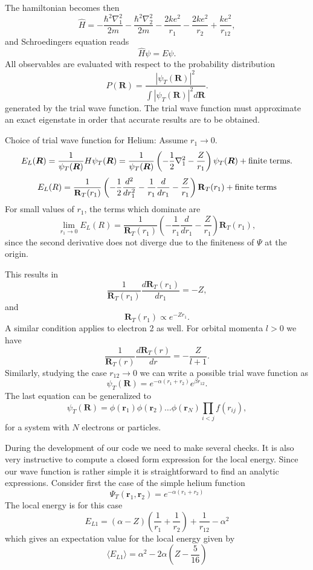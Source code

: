 \documentclass[%
oneside,                 %
final,                   %
10pt]{article}
\begin{document}
The hamiltonian becomes then
\[
   \hat{H}=-\frac{\hbar^2\nabla_1^2}{2m}-\frac{\hbar^2\nabla_2^2}{2m}
          -\frac{2ke^2}{r_1}-\frac{2ke^2}{r_2}+
               \frac{ke^2}{r_{12}},
\]
and  Schroedingers equation reads
\[
   \hat{H}\psi=E\psi.
\]
All observables are evaluated with respect to the probability distribution
\[
   P(\bm{R})= \frac{\left|\psi_T(\bm{R})\right|^2}{\int \left|\psi_T(\bm{R})\right|^2d\bm{R}}.
\]
generated by the trial wave function.   
The trial wave function must approximate an exact 
eigenstate in order that accurate results are to be obtained. 

Choice of trial wave function for Helium:
Assume $r_1 \rightarrow 0$.
\[
   E_L(\bm{R})=\frac{1}{\psi_T(\bm{R})}H\psi_T(\bm{R})=
     \frac{1}{\psi_T(\bm{R})}\left(-\frac{1}{2}\nabla^2_1
     -\frac{Z}{r_1}\right)\psi_T(\bm{R}) + \mathrm{finite \hspace{0.1cm}terms}.
\]
\[ 
    E_L(R)=
    \frac{1}{\mathbf{R}_T(r_1)}\left(-\frac{1}{2}\frac{d^2}{dr_1^2}-
     \frac{1}{r_1}\frac{d}{dr_1}
     -\frac{Z}{r_1}\right)\mathbf{R}_T(r_1) + \mathrm{finite\hspace{0.1cm} terms}
\]
For small values of $r_1$, the terms which dominate are
\[ 
    \lim_{r_1 \rightarrow 0}E_L(R)=
    \frac{1}{\mathbf{R}_T(r_1)}\left(-
     \frac{1}{r_1}\frac{d}{dr_1}
     -\frac{Z}{r_1}\right)\mathbf{R}_T(r_1),
\]
since the second derivative does not diverge due to the finiteness of  $\Psi$ at the origin.

This results in
\[
     \frac{1}{\mathbf{R}_T(r_1)}\frac{d \mathbf{R}_T(r_1)}{dr_1}=-Z,
\]
and
\[
   \mathbf{R}_T(r_1)\propto e^{-Zr_1}.
\]
A similar condition applies to electron 2 as well. 
For orbital momenta $l > 0$ we have 
\[
     \frac{1}{\mathbf{R}_T(r)}\frac{d \mathbf{R}_T(r)}{dr}=-\frac{Z}{l+1}.
\]
Similarly, studying the case $r_{12}\rightarrow 0$ we can write 
a possible trial wave function as
\[
   \psi_T(\bm{R})=e^{-\alpha(r_1+r_2)}e^{\beta r_{12}}.
    \label{eq:wavehelium2}
\]
The last equation can be generalized to
\[
   \psi_T(\bm{R})=\phi(\bm{r}_1)\phi(\bm{r}_2)\dots\phi(\bm{r}_N)
                   \prod_{i < j}f(r_{ij}),
\]
for a system with $N$ electrons or particles. 

During the development of our code we need to make several checks. It is also very instructive to compute a closed form expression for the local energy. Since our wave function is rather simple  it is straightforward
to find an analytic expressions.  Consider first the case of the simple helium function 
\[
   \Psi_T(\bm{r}_1,\bm{r}_2) = e^{-\alpha(r_1+r_2)}
\]
The local energy is for this case 
\[ 
E_{L1} = \left(\alpha-Z\right)\left(\frac{1}{r_1}+\frac{1}{r_2}\right)+\frac{1}{r_{12}}-\alpha^2
\]
which gives an expectation value for the local energy given by
\[
\langle E_{L1} \rangle = \alpha^2-2\alpha\left(Z-\frac{5}{16}\right)
\]
\end{document}
